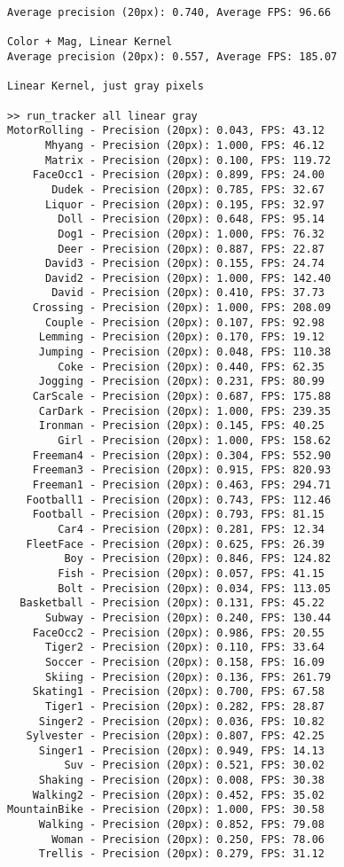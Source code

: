 \begin{lstlisting}
Average precision (20px): 0.740, Average FPS: 96.66

Color + Mag, Linear Kernel
Average precision (20px): 0.557, Average FPS: 185.07

Linear Kernel, just gray pixels

>> run_tracker all linear gray
MotorRolling - Precision (20px): 0.043, FPS: 43.12
      Mhyang - Precision (20px): 1.000, FPS: 46.12
      Matrix - Precision (20px): 0.100, FPS: 119.72
    FaceOcc1 - Precision (20px): 0.899, FPS: 24.00
       Dudek - Precision (20px): 0.785, FPS: 32.67
      Liquor - Precision (20px): 0.195, FPS: 32.97
        Doll - Precision (20px): 0.648, FPS: 95.14
        Dog1 - Precision (20px): 1.000, FPS: 76.32
        Deer - Precision (20px): 0.887, FPS: 22.87
      David3 - Precision (20px): 0.155, FPS: 24.74
      David2 - Precision (20px): 1.000, FPS: 142.40
       David - Precision (20px): 0.410, FPS: 37.73
    Crossing - Precision (20px): 1.000, FPS: 208.09
      Couple - Precision (20px): 0.107, FPS: 92.98
     Lemming - Precision (20px): 0.170, FPS: 19.12
     Jumping - Precision (20px): 0.048, FPS: 110.38
        Coke - Precision (20px): 0.440, FPS: 62.35
     Jogging - Precision (20px): 0.231, FPS: 80.99
    CarScale - Precision (20px): 0.687, FPS: 175.88
     CarDark - Precision (20px): 1.000, FPS: 239.35
     Ironman - Precision (20px): 0.145, FPS: 40.25
        Girl - Precision (20px): 1.000, FPS: 158.62
    Freeman4 - Precision (20px): 0.304, FPS: 552.90
    Freeman3 - Precision (20px): 0.915, FPS: 820.93
    Freeman1 - Precision (20px): 0.463, FPS: 294.71
   Football1 - Precision (20px): 0.743, FPS: 112.46
    Football - Precision (20px): 0.793, FPS: 81.15
        Car4 - Precision (20px): 0.281, FPS: 12.34
   FleetFace - Precision (20px): 0.625, FPS: 26.39
         Boy - Precision (20px): 0.846, FPS: 124.82
        Fish - Precision (20px): 0.057, FPS: 41.15
        Bolt - Precision (20px): 0.034, FPS: 113.05
  Basketball - Precision (20px): 0.131, FPS: 45.22
      Subway - Precision (20px): 0.240, FPS: 130.44
    FaceOcc2 - Precision (20px): 0.986, FPS: 20.55
      Tiger2 - Precision (20px): 0.110, FPS: 33.64
      Soccer - Precision (20px): 0.158, FPS: 16.09
      Skiing - Precision (20px): 0.136, FPS: 261.79
    Skating1 - Precision (20px): 0.700, FPS: 67.58
      Tiger1 - Precision (20px): 0.282, FPS: 28.87
     Singer2 - Precision (20px): 0.036, FPS: 10.82
   Sylvester - Precision (20px): 0.807, FPS: 42.25
     Singer1 - Precision (20px): 0.949, FPS: 14.13
         Suv - Precision (20px): 0.521, FPS: 30.02
     Shaking - Precision (20px): 0.008, FPS: 30.38
    Walking2 - Precision (20px): 0.452, FPS: 35.02
MountainBike - Precision (20px): 1.000, FPS: 30.58
     Walking - Precision (20px): 0.852, FPS: 79.08
       Woman - Precision (20px): 0.250, FPS: 78.06
     Trellis - Precision (20px): 0.279, FPS: 31.12


\end{lstlisting}
